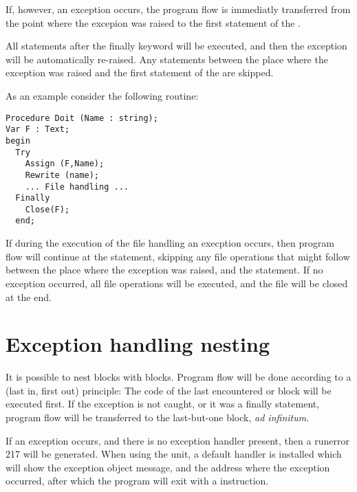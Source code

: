 If, however, an exception occurs, the program flow is immediatly
transferred from the point where the excepion was raised to the first
statement of the .

All statements after the finally keyword will be executed, and then
the exception will be automatically re-raised. Any statements between the
place where the exception was raised and the first statement of the
 are skipped.

As an example consider the following routine:
\begin{verbatim}
Procedure Doit (Name : string);
Var F : Text;
begin
  Try
    Assign (F,Name);
    Rewrite (name);
    ... File handling ...
  Finally
    Close(F);
  end;
\end{verbatim}
If during the execution of the file handling an execption occurs, then
program flow will continue at the  statement, skipping any
file operations that might follow between the place where the exception
was raised, and the  statement.
If no exception occurred, all file operations will be executed, and the file
will be closed at the end.


\section{Exception handling nesting}
It is possible to nest  blocks with 
blocks. Program flow will be done according to a  (last in, first
out) principle: The code of the last encountered  or
  block will be executed first. If the exception is not
caught, or it was a finally statement, program flow will be transferred to
the last-but-one block, {\em ad infinitum}.

If an exception occurs, and there is no exception handler present, then a
runerror 217 will be generated. When using the  unit, a default
handler is installed which will show the exception object message, and the
address where the exception occurred, after which the program will exit with
a  instruction.


